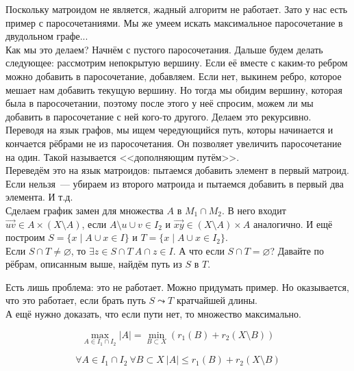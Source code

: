 \documentclass{article}
\begin{document}
    \begin{remark}
        Поскольку матроидом не является, жадный алгоритм не работает. Зато у нас есть пример с паросочетаниями. Мы же умеем искать максимальное паросочетание в двудольном графе...\\
        Как мы это делаем? Начнём с пустого паросочетания. Дальше будем делать следующее: рассмотрим непокрытую вершину. Если её вместе с каким-то ребром можно добавить в паросочетание, добавляем. Если нет, выкинем ребро, которое мешает нам добавить текущую вершину. Но тогда мы обидим вершину, которая была в паросочетании, поэтому после этого у неё спросим, можем ли мы добавить в паросочетание с ней кого-то другого. Делаем это рекурсивно.\\
        Переводя на язык графов, мы ищем чередующийся путь, которы начинается и кончается рёбрами не из паросочетания. Он позволяет увеличить паросочетание на один. Такой называется <<дополняющим путём>>.\\
        Переведём это на язык матроидов: пытаемся добавить элемент в первый матроид. Если нельзя~--- убираем из второго матроида и пытаемся добавить в первый два элемента. И т.д.\\
        Сделаем график замен для множества $A$ в $M_1\cap M_2$. В него входит $\vec{uv}\in A\times(X\setminus A)$, если $A\setminus u\cup v\in I_2$ и $\vec{xy}\in(X\setminus A)\times A$ аналогично. И ещё построим $S=\{x\mid A\cup x\in I\}$ и $T=\{x\mid A\cup x\in I_2\}$.\\
        Если $S\cap T\neq\varnothing$, то $\exists z\in S\cap T~A\cap z\in I$. А что если $S\cap T=\varnothing$? Давайте по рёбрам, описанным выше, найдём путь из $S$ в $T$.
    \end{remark}
    \begin{remark}
        Есть лишь проблема: это не работает. Можно придумать пример. Но оказывается, что это работает, если брать путь $S\leadsto T$ кратчайшей длины.\\
        А ещё нужно доказать, что если пути нет, то множество максимально.
    \end{remark}
    \begin{theorem}
        $$
        \max\limits_{A\in I_1\cap I_2}|A|=\min\limits_{B\subset X}(r_1(B)+r_2(X\setminus B))
        $$
    \end{theorem}
    \begin{lemma}
        $$
        \forall A\in I_1\cap I_2~\forall B\subset X~|A|\leqslant r_1(B)+r_2(X\setminus B)
        $$
    \end{lemma}
\end{document}
